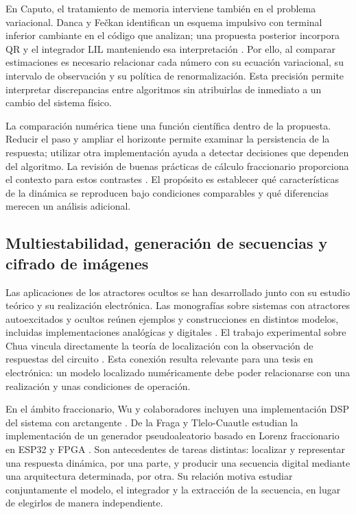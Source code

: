 En Caputo, el tratamiento de memoria interviene también en el problema
variacional. Danca y Fečkan identifican un esquema impulsivo con terminal
inferior cambiante en el código que analizan; una propuesta posterior
incorpora QR y el integrador LIL manteniendo esa interpretación
\cite{DancaFeckan2024MemoryPrinciple,Danca2026ImprovedLyapunov}.
Por ello, al comparar estimaciones es necesario relacionar cada número con
su ecuación variacional, su intervalo de observación y su política de
renormalización. Esta precisión permite interpretar discrepancias entre
algoritmos sin atribuirlas de inmediato a un cambio del sistema físico.

La comparación numérica tiene una función científica dentro de la
propuesta. Reducir el paso y ampliar el horizonte permite examinar la
persistencia de la respuesta; utilizar otra implementación ayuda a
detectar decisiones que dependen del algoritmo. La revisión de buenas
prácticas de cálculo fraccionario proporciona el contexto para estos
contrastes \cite{Diethelm2020_afcee}. El propósito es establecer qué
características de la dinámica se reproducen bajo condiciones comparables
y qué diferencias merecen un análisis adicional.

\subsection{Multiestabilidad, generación de secuencias y cifrado de imágenes}

Las aplicaciones de los atractores ocultos se han desarrollado junto con
su estudio teórico y su realización electrónica. Las monografías sobre
sistemas con atractores autoexcitados y ocultos reúnen ejemplos y
construcciones en distintos modelos, incluidas implementaciones analógicas
y digitales \cite{PhamEtAl2018HiddenAttractors,PhamVolosKapitaniak2017Systems}.
El trabajo experimental sobre Chua vincula directamente la teoría de
localización con la observación de respuestas del circuito
\cite{KuznetsovEtAl2023ChuaExperiments}. Esta conexión resulta relevante
para una tesis en electrónica: un modelo localizado numéricamente debe
poder relacionarse con una realización y unas condiciones de operación.

En el ámbito fraccionario, Wu y colaboradores incluyen una implementación
DSP del sistema con arctangente \cite{Wu2023ArctanChua}. De la Fraga y
Tlelo-Cuautle estudian la implementación de un generador pseudoaleatorio
basado en Lorenz fraccionario en ESP32 y FPGA
\cite{Fraga2026_54625}. Son antecedentes de tareas distintas: localizar
y representar una respuesta dinámica, por una parte, y producir una
secuencia digital mediante una arquitectura determinada, por otra.
Su relación motiva estudiar conjuntamente el modelo, el integrador y la
extracción de la secuencia, en lugar de elegirlos de manera independiente.

